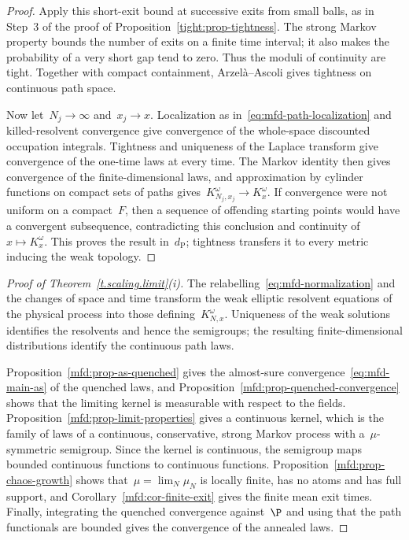 \documentclass[11pt]{amsart}
\begin{document}
\begin{proof}
\smallskip

Apply this short-exit bound at successive exits from small balls, as in Step~3 of the proof of Proposition~\ref{tight:prop-tightness}. The strong Markov property bounds the number of exits on a finite time interval; it also makes the probability of a very short gap tend to zero. Thus the moduli of continuity are tight. Together with compact containment, Arzel\`a--Ascoli gives tightness on continuous path space.

\smallskip

Now let~$N_j\to\infty$ and~$x_j\to x$. Localization as in~\eqref{eq:mfd-path-localization} and killed-resolvent convergence give convergence of the whole-space discounted occupation integrals. Tightness and uniqueness of the Laplace transform give convergence of the one-time laws at every time. The Markov identity then gives convergence of the finite-dimensional laws, and approximation by cylinder functions on compact sets of paths gives~$K^\omega_{N_j,x_j}\to K^\omega_x$. If convergence were not uniform on a compact~$F$, then a sequence of offending starting points would have a convergent subsequence, contradicting this conclusion and continuity of~$x\mapsto K^\omega_x$. This proves the result in~$d_{\mathrm P}$; tightness transfers it to every metric inducing the weak topology.
\end{proof}

\begin{proof}[Proof of Theorem~\ref{t.scaling.limit}(i)]
The relabelling~\eqref{eq:mfd-normalization} and the changes of space and time transform the weak elliptic resolvent equations of the physical process into those defining~$K^\omega_{N,x}$. Uniqueness of the weak solutions identifies the resolvents and hence the semigroups; the resulting finite-dimensional distributions identify the continuous path laws.

\smallskip

Proposition~\ref{mfd:prop-as-quenched} gives the almost-sure convergence~\eqref{eq:mfd-main-as} of the quenched laws, and Proposition~\ref{mfd:prop-quenched-convergence} shows that the limiting kernel is measurable with respect to the fields. Proposition~\ref{mfd:prop-limit-properties} gives a continuous kernel, which is the family of laws of a continuous, conservative, strong Markov process with a~$\mu$-symmetric semigroup. Since the kernel is continuous, the semigroup maps bounded continuous functions to continuous functions. Proposition~\ref{mfd:prop-chaos-growth} shows that~$\mu=\lim_N\mu_N$ is locally finite, has no atoms and has full support, and Corollary~\ref{mfd:cor-finite-exit} gives the finite mean exit times. Finally, integrating the quenched convergence against~$\P$ and using that the path functionals are bounded gives the convergence of the annealed laws.
\end{proof}
\end{document}
